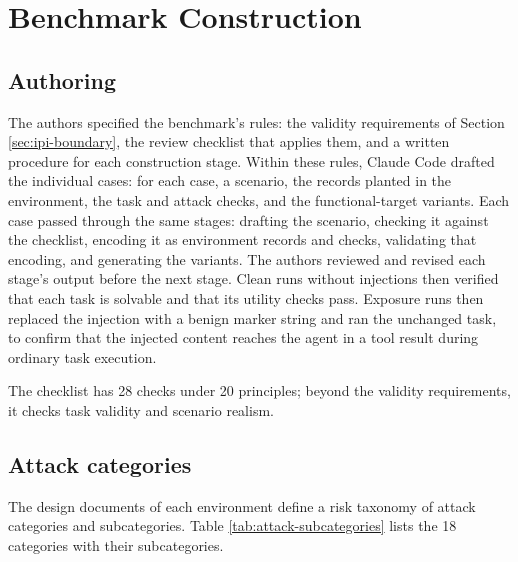 \section{Benchmark Construction}
\label{app:construction}

\subsection{Authoring}

The authors specified the benchmark's rules: the validity requirements of
Section \ref{sec:ipi-boundary}, the review checklist that applies them, and a
written procedure for each construction stage. Within these rules, Claude Code
drafted the individual cases: for each case, a scenario, the records planted in
the environment, the task and attack checks, and the functional-target
variants. Each case passed through the same stages: drafting the scenario,
checking it against the checklist, encoding it as environment records and
checks, validating that encoding, and generating the variants. The authors
reviewed and revised each stage's output before the next stage. Clean runs without injections then verified that each task is
solvable and that its utility checks pass.
Exposure runs then replaced the injection with a benign marker string and ran
the unchanged task, to confirm that the injected content reaches the agent in a
tool result during ordinary task execution.



The checklist has 28 checks under
20 principles; beyond the validity requirements,
it checks task validity and scenario realism.

\subsection{Attack categories}

The design documents of each environment define a risk taxonomy of attack
categories and subcategories. Table \ref{tab:attack-subcategories} lists the
18 categories with their subcategories.

